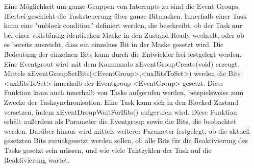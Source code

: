 Eine Möglichkeit um ganze Gruppen von Interrupts zu sind die Event Groups. Hierbei geschieht die Tasksteuerung über ganze Bitmasken. Innerhalb einer Task kann eine "unblock condition" definiert werden, die beschreibt, ob der Task nur bei einer vollständig identischen Maske in den Zustand Ready wechselt, oder ob es bereits ausreicht, dass ein einzelnes Bit in der Maske gesetzt wird. Die Bedeutung der einzelnen Bits kann durch die Entwickler frei festgelegt werden. Eine Eventgrout wird mit dem Kommando xEventGroupCreate(void) erzeugt. Mittels xEventGroupSetBits(<EventGroup>,<uxBitsToSet>) werden die Bits <uxBitsToSet> innerhalb der Eventgroup <EventGroup> gesetzt. Diese Funktion kann auch innerhalb von Tasks aufgerufen werden, beispielsweise zum Zwecke der Tasksynchronisation. Eine Task kann sich in den Blocked Zustand versetzen, indem xEventDroupWaitForBits() aufgerufen wird. Diese Funktion erhält außerdem als Parameter die Eventgroup sowie die Bits, die beobachtet werden. Darüber hinaus wird mittels weiterer Parameter festgelegt, ob die aktuell gesetzten Bits zurückgesetzt werden sollen, ob alle Bits für die Reaktivierung des Tasks gesetzt sein müssen, und wie viele Taktzyklen der Task auf die Reaktivierung wartet.
